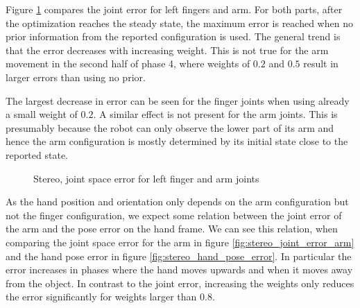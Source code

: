 Figure \ref{fig:stereo_joint_error} compares the joint error for left fingers and arm. For both parts, after the optimization reaches the steady state, the maximum error is reached when no prior information from the reported configuration is used.
The general trend is that the error decreases with increasing weight. This is not true for the arm movement in the second half of phase 4, where weights of $0.2$ and $0.5$ result in larger errors than using no prior.

The largest decrease in error can be seen for the finger joints when using already a small weight of $0.2$. A similar effect is not present for the arm joints. This is presumably because the robot can only observe the lower part of its arm and hence the arm configuration is mostly determined by its initial state close to the reported state.


\begin{figure}
\centering
{}
%
\caption{Stereo, joint space error for left finger and arm joints}
\label{fig:stereo_joint_error}
\end{figure}

As the hand position and orientation only depends on the arm configuration but not the finger configuration, we expect some relation between the joint error of the arm and the pose error on the hand frame. We can see this relation, when comparing the joint space error for the arm in figure \ref{fig:stereo_joint_error_arm} and the hand pose error in figure \ref{fig:stereo_hand_pose_error}. In particular the error increases in phases where the hand moves upwards and when it moves away from the object. In contrast to the joint error, increasing the weights only reduces the error significantly for weights larger than $0.8$.

